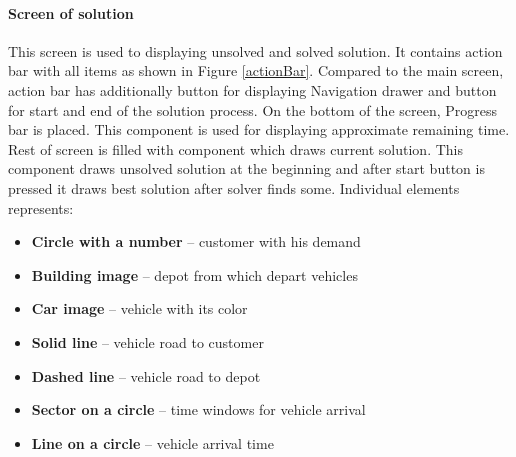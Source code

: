 \paragraph{Screen of solution}
This screen is used to displaying unsolved and solved solution. It contains action bar with all items as shown in Figure
\ref{actionBar}. Compared to the main screen, action bar has additionally button for displaying Navigation drawer and
button for start and end of the solution process. On the bottom of the screen, Progress bar is placed. This component
is used for displaying approximate remaining time. Rest of screen is filled with component which draws current solution.
This component draws unsolved solution at the beginning and after start button is pressed it draws best solution after
solver finds some. Individual elements represents:

\begin{itemize}
  \item \textbf{Circle with a number} -- customer with his demand
  \item \textbf{Building image} -- depot from which depart vehicles
  \item \textbf{Car image} -- vehicle with its color
  \item \textbf{Solid line} -- vehicle road to customer
  \item \textbf{Dashed line} -- vehicle road to depot
  \item \textbf{Sector on a circle} -- time windows for vehicle arrival
  \item \textbf{Line on a circle} -- vehicle arrival time
\end{itemize}


